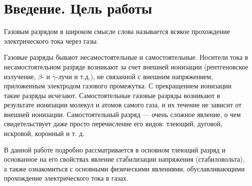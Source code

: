 \documentclass[a4paper, 12pt]{article}
\begin{document}
	\section{Введение. Цель работы}
	Газовым разрядом в широком смысле слова называется всякое прохождение электрического тока через газы.\par
	Газовые разряды бывают несамостоятельные и самостоятельные. Носители  тока в несамостоятельном разряде возникают за счет внешней ионизации (рентгеновское излучение, $\beta$- и $\gamma$-лучи и т.д.), не связанной с внешним напряжением, приложенным электродом газового промежутка. С прекращением ионизации такие разряды исчезают. Самостоятельные газовые разряды возникают в результате ионизации молекул и атомов самого газа, и их течение не зависит от внешней ионизации. Самостоятельный разряд — очень сложное явление, о чем свидетельствует даже просто перечисление его видов: тлеющий, дуговой, искровой, коронный и т. д.\par
	В данной работе подробно рассматривается в основном тлеющий разряд и основанное на его свойствах явление стабилизации напряжения (стабиловольта), а также ознакомиться с основными физическими явлениями, обуславливающими прохождение электрического тока в газах.
\end{document}
